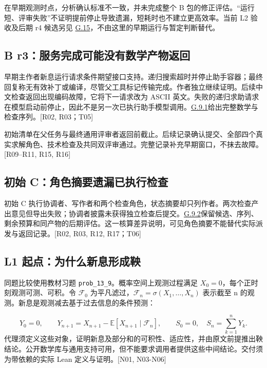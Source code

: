 在早期观测时点，分析确认标准不一致，并未完成整个 B 包的修正评估。“运行短、评审失败”不证明提前停止导致遗漏，短耗时也不建立更高效率。当前 L2 验收及后期 r4 候选另见 \hyperlink{g15}{G.15}，不由这里的早期运行与暂定判断替代。

\subsection[B r3：服务完成可能没有数学产物返回]{\texorpdfstring{\protect\hypertarget{g3}{}B r3：服务完成可能没有数学产物返回}{B r3：服务完成可能没有数学产物返回}}
早期主作者新息运行请求条件期望接口支持。递归搜索超时并停止助手容器；最终回复称无有效补丁或编译，尽管父工具标记传输完成。作者独立继续证明。后续中文检查返回出现编码故障，它将下一请求改为 ASCII 英文。失败的递归求助请求在模型启动前停止，因此不是另一次已执行助手模型调用。\hyperlink{g9-1}{G.9.1}给出完整数学与检查序列。[R02, R03；T05]

初始清单在父任务与最终通用评审者返回前截止。后续记录确认提交、全部四个真实求解角色、技术检查及共同双评审通过。完整记录补充早期窗口，不抹去故障。[R09–R11, R15, R16]

\subsection[初始 C：角色摘要遗漏已执行检查]{\texorpdfstring{\protect\hypertarget{g4}{}初始 C：角色摘要遗漏已执行检查}{初始 C：角色摘要遗漏已执行检查}}
初始 C 执行协调者、写作者和两个检查角色，状态摘要却只列作者。两次检查产出意见但导出失败；协调者披露未获得独立检查后提交。\hyperlink{g9-2}{G.9.2}保留候选、序列、剩余预算和同产物的后期评估。这一核算差异说明，可见角色摘要不能替代实际派发与返回记录。[R02, R03, R12, R17；T06]

\subsection[L1 起点：为什么新息形成鞅]{\texorpdfstring{\protect\hypertarget{g5}{}L1 起点：为什么新息形成鞅}{L1 起点：为什么新息形成鞅}}
同题比较使用教材习题 \nolinkurl{prob_13_9}。概率空间上观测过程满足 $X_0=0$，每个正时刻观测可测、可积。令 $\mathcal F_0$ 为平凡滤过，$\mathcal F_n=\sigma(X_1,\ldots,X_n)$ 表示截至 n 的观测。新息是观测减去基于过去信息的条件预测：

\[
Y_0=0,\qquad Y_{n+1}=X_{n+1}-\mathbb E[X_{n+1}\mid\mathcal F_n],
\qquad S_0=0,\quad S_n=\sum_{k=1}^{n}Y_k.
\]
代理须定义这些对象，证明新息及部分和的可积性、适应性，并由原文前提推出鞅结论。公开数学库与通用支持可用，但不能要求调用者提供这些中间结论。交付须为带依赖的实际 Lean 定义与证明。[N01, N03-N06]

